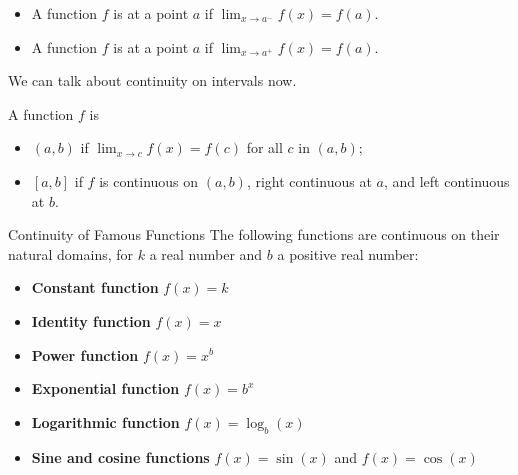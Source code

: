\documentclass[10pt,t,presentation,ignorenonframetext,aspectratio=169]{beamer}
\begin{document}
\begin{frame}
  \vs
  \begin{definition}
    \begin{itemize}
    \item A function $f$ is  at a point $a$ if
      $\lim_{x\to a^-} f(x) = f(a)$.
    \item A function $f$ is  at a point $a$ if
      $\lim_{x\to a^+} f(x) = f(a)$.
    \end{itemize}
  \end{definition}
  \vspace{1cm}
  We can talk about continuity on intervals now.
  \begin{definition}
    A function $f$ is
    \begin{itemize}
    \item {} $(a,b)$ if
      $\lim_{x\to c} f(x) = f(c)$ for all $c$ in $(a,b)$;
    \item {} $[a,b]$ if $f$ is
      continuous on $(a,b)$, right continuous at $a$, and left
      continuous at $b$.
    \end{itemize}
  \end{definition}
\end{frame}

\begin{frame}
  \vs
  \begin{block}{Continuity of Famous Functions}\label{theorem:continuity}
    The following functions are continuous on their natural domains, for $k$ a real number and $b$ a positive real number:
    \begin{itemize}
    \item \textbf{Constant function}  $f(x) =k$
    \item \textbf{Identity function}  $f(x) = x$
    \item \textbf{Power function}  $f(x)=x^b$
    \item \textbf{Exponential function}  $f(x)=b^x$
    \item \textbf{Logarithmic function}  $f(x)=\log_b(x)$
    \item \textbf{Sine and cosine functions}  $f(x)=\sin(x)$ and $f(x)=\cos(x)$
    \end{itemize}
  \end{block}
\end{frame}
\end{document}
